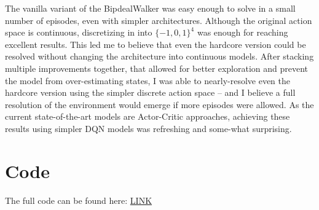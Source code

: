 \documentclass{article}
\begin{document}
\begin{multicols}{2}
The vanilla variant of the BipdealWalker was easy enough to solve in a small number of episodes, even with simpler architectures. Although the original action space is continuous, discretizing in into $\{-1, 0, 1\}^4$ was enough for reaching excellent results. This led me to believe that even the hardcore version could be resolved without changing the architecture into continuous models. After stacking multiple improvements together, that allowed for better exploration and prevent the model from over-estimating states, I was able to nearly-resolve even the hardcore version using the simpler discrete action space -- and I believe a full resolution of the environment would emerge if more episodes were allowed. As the current state-of-the-art models are Actor-Critic approaches, achieving these results using simpler DQN models was refreshing and some-what surprising.

\section{Code}
The full code can be found here: \href{https://colab.research.google.com/drive/1_gxpvbnFv3lCQh4Ce_f1osPcGhwog27W?usp=sharing}{LINK}




\end{multicols}
\end{document}
